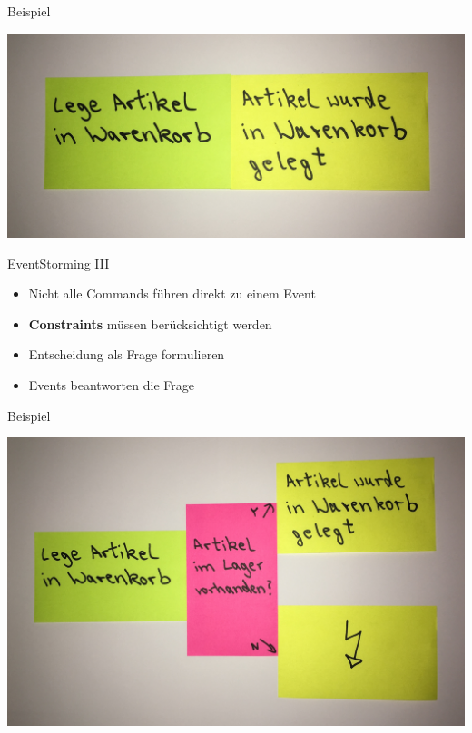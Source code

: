 \begin{frame}[fragile]{Beispiel}

\begin{center}
\includegraphics[width=.7\textwidth]{pics/eventstorming2.jpg}
\end{center}

\end{frame}


\begin{frame}[fragile]{EventStorming III}

\begin{itemize}
\item Nicht alle Commands führen direkt zu einem Event
\item \textbf{Constraints} müssen berücksichtigt werden
\item Entscheidung als Frage formulieren
\item Events beantworten die Frage
\end{itemize}

\end{frame}

\begin{frame}[fragile]{Beispiel}

\begin{center}
\includegraphics[width=.85\textwidth]{pics/eventstorming3.jpg}
\end{center}

\end{frame}

